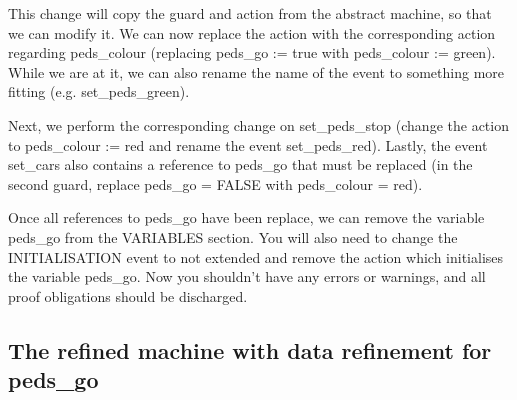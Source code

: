 This change will copy the guard and action from the abstract machine, so that we can modify it.  We can now replace the action with the corresponding action regarding \textsf{peds\_colour} (replacing \textsf{peds\_go := true} with \textsf{peds\_colour := green}).  While we are at it, we can also rename the name of the event to something more fitting (e.g. \textsf{set\_peds\_green}).

Next, we perform the corresponding change on \textsf{set\_peds\_stop} (change the action to \textsf{peds\_\-colour := red} and rename the event \textsf{set\_peds\_red}). Lastly, the event \textsf{set\_cars} also contains a reference to \textsf{peds\_go} that must be replaced (in the second guard, replace \textsf{peds\_go = FALSE} with \textsf{peds\_colour = red}).

Once all references to \textsf{peds\_go} have been replace, we can remove the variable \textsf{peds\_go} from the \textsf{VARIABLES} section. You will also need to change the \textsf{INITIALISATION} event to \textsf{not extended} and remove the action which initialises the variable \textsf{peds\_go}. Now you shouldn't have any errors or warnings, and all proof obligations should be discharged.


\subsection{The refined machine with data refinement for peds\_go}
\label{tut_refined_machine}

